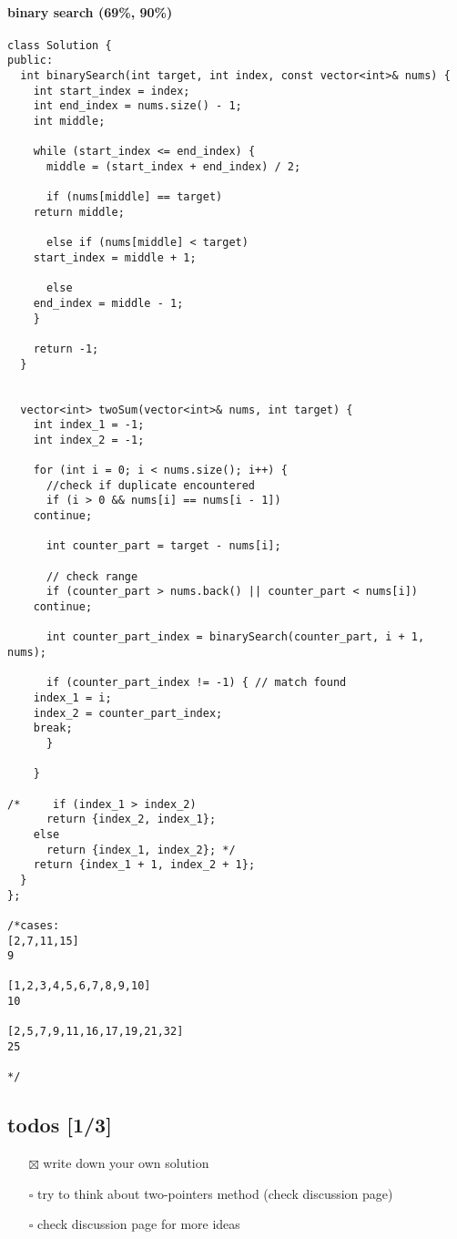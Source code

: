 \documentclass[12pt]{article}
\begin{document}
\paragraph{binary search (69\%, 90\%)}
\label{sec:orgcc53dbc}
\begin{verbatim}
class Solution {
public:
  int binarySearch(int target, int index, const vector<int>& nums) {
    int start_index = index;
    int end_index = nums.size() - 1;
    int middle;

    while (start_index <= end_index) {
      middle = (start_index + end_index) / 2;

      if (nums[middle] == target)
	return middle;

      else if (nums[middle] < target)
	start_index = middle + 1;

      else
	end_index = middle - 1;
    }

    return -1;
  }


  vector<int> twoSum(vector<int>& nums, int target) {    
    int index_1 = -1;
    int index_2 = -1;

    for (int i = 0; i < nums.size(); i++) {
      //check if duplicate encountered
      if (i > 0 && nums[i] == nums[i - 1])
	continue;

      int counter_part = target - nums[i];

      // check range
      if (counter_part > nums.back() || counter_part < nums[i])
	continue;

      int counter_part_index = binarySearch(counter_part, i + 1, nums);

      if (counter_part_index != -1) { // match found
	index_1 = i;
	index_2 = counter_part_index;
	break;
      }     

    }

/*     if (index_1 > index_2)
      return {index_2, index_1};
    else
      return {index_1, index_2}; */
    return {index_1 + 1, index_2 + 1};
  }
};

/*cases: 
[2,7,11,15]
9

[1,2,3,4,5,6,7,8,9,10]
10

[2,5,7,9,11,16,17,19,21,32]
25

*/
\end{verbatim}
\subsection{todos [1/3]}
\label{sec:org164a7e4}
\begin{itemize}
\item[{$\boxtimes$}] write down your own solution
\item[{$\square$}] try to think about two-pointers method (check discussion page)
\item[{$\square$}] check discussion page for more ideas
\end{itemize}
\end{document}
